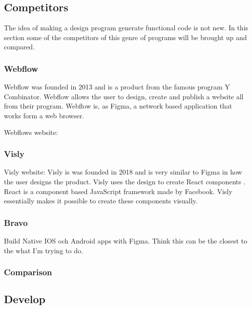 \subsection{Competitors}%
\label{sub:Competitors}
The idea of making a design program generate functional code is not new. In this section some of the competitors of this genre of programs will be brought up and compared.

\subsubsection{Webflow}
Webflow was founded in 2013 and is a product from the famous program Y Combinator. Webflow allows the user to design, create and publish a website all from their program. Webflow is, as Figma, a network based application that works form a web browser. 



Webflows website: \cite{ResponsiveWebDesign} 

\subsubsection{Visly}%
\label{ssub:Visly}
Visly website: \cite{vislyVisly} 
Visly is was founded in 2018 and is very similar to Figma in how the user designs the product. Visly uses the design to create React components \cite{facebookincReactJavaScriptLibrary}. React is a component based JavaScript framework made by Facebook. Visly essentially makes it possible to create these components visually.

\subsubsection{Bravo}%
\label{ssub:Bravo}

Build Native IOS och Android apps with Figma. Think this can be the closest to the what I'm trying to do. 

\subsubsection{Comparison}%
\label{ssub:Comparison}




\subsection{Develop}%
\label{sub:Develop}

